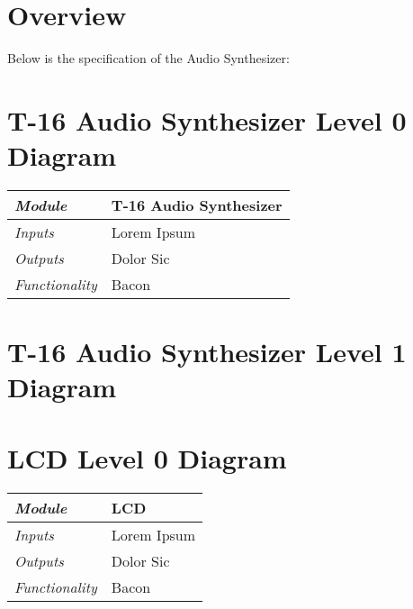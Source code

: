 \documentclass{article}
\begin{document}
\newenvironment{frcseries}{\fontfamily{frc}\selectfont}{}
\newcommand{\textfrc}[1]{{\frcseries#1}}
\newcommand{\mathfrc}[1]{\text{\textfrc{#1}}}

\section{Overview}
Below is the specification of the Audio Synthesizer:


\section{T-16 Audio Synthesizer Level 0 Diagram}

\begin{tabular}{|p{1in}|p{5in}|}
\hline
\emph{Module} & T-16 Audio Synthesizer \\
\hline
\emph{Inputs}& Lorem Ipsum\\
\hline
\emph{Outputs}& Dolor Sic \\ 
\hline
\emph{Functionality}& Bacon\\
\hline
\end{tabular}

\section{T-16 Audio Synthesizer Level 1 Diagram}


\section{LCD Level 0 Diagram}

\begin{tabular}{|p{1in}|p{5in}|}
\hline
\emph{Module} & LCD \\
\hline
\emph{Inputs}& Lorem Ipsum\\
\hline
\emph{Outputs}& Dolor Sic \\ 
\hline
\emph{Functionality}& Bacon\\
\hline
\end{tabular}
\end{document}
